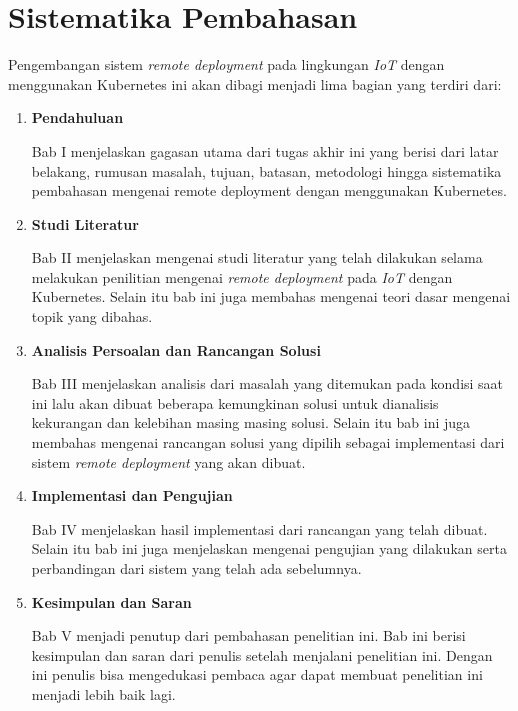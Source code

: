 \section{Sistematika Pembahasan}

Pengembangan sistem \textit{remote deployment} pada lingkungan \textit{IoT} dengan menggunakan Kubernetes ini akan dibagi menjadi lima bagian yang terdiri dari:

\begin{enumerate}
  \item \textbf{Pendahuluan}

        Bab I menjelaskan gagasan utama dari tugas akhir ini yang berisi dari latar belakang, rumusan masalah, tujuan, batasan, metodologi hingga sistematika pembahasan mengenai remote deployment dengan menggunakan Kubernetes.

  \item \textbf{Studi Literatur}

        Bab II menjelaskan mengenai studi literatur yang telah dilakukan selama melakukan penilitian mengenai \textit{remote deployment} pada \textit{IoT} dengan Kubernetes. Selain itu bab ini juga membahas mengenai teori dasar mengenai topik yang dibahas.

  \item \textbf{Analisis Persoalan dan Rancangan Solusi}

        Bab III menjelaskan analisis dari masalah yang ditemukan pada kondisi saat ini lalu akan dibuat beberapa kemungkinan solusi untuk dianalisis kekurangan dan kelebihan masing masing solusi. Selain itu bab ini juga membahas mengenai rancangan solusi yang dipilih sebagai implementasi dari sistem \textit{remote deployment} yang akan dibuat.

  \item \textbf{Implementasi dan Pengujian}


        Bab IV menjelaskan hasil implementasi dari rancangan yang telah dibuat. Selain itu bab ini juga menjelaskan mengenai pengujian yang dilakukan serta perbandingan dari sistem yang telah ada sebelumnya.

  \item \textbf{Kesimpulan dan Saran}


        Bab V menjadi penutup dari pembahasan penelitian ini. Bab ini berisi kesimpulan dan saran dari penulis setelah menjalani penelitian ini. Dengan ini penulis bisa mengedukasi pembaca agar dapat membuat penelitian ini menjadi lebih baik lagi.

\end{enumerate}